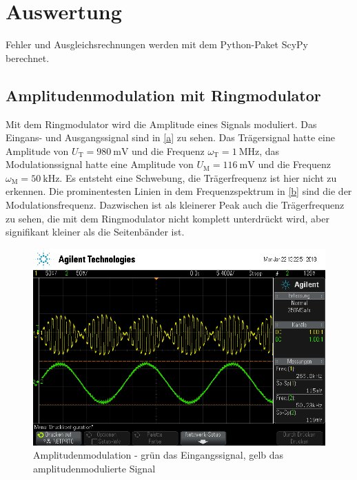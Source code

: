 \section{Auswertung}

Fehler und Ausgleichsrechnungen werden mit dem Python-Paket ScyPy \cite{scypy} berechnet.

\subsection{Amplitudenmodulation mit Ringmodulator}

Mit dem Ringmodulator wird die Amplitude eines Signals moduliert. Das Eingans- und Ausgangssignal sind in \autoref{a} zu sehen. Das Trägersignal hatte eine Amplitude von $U_\text{T}=\SI{980}{\milli\volt}$ und die Frequenz $\omega_\text{T}=\SI{1}{\mega\hertz}$, das Modulationssignal hatte eine Amplitude von $U_\text{M}=\SI{116}{\milli\volt}$ und die Frequenz $\omega_\text{M}=\SI{50}{\kilo\hertz}$. Es entsteht eine Schwebung, die Trägerfrequenz ist hier nicht zu erkennen. Die prominentesten Linien in dem Frequenzspektrum in \autoref{b} sind die der Modulationsfrequenz. Dazwischen ist als kleinerer Peak auch die Trägerfrequenz zu sehen, die mit dem Ringmodulator nicht komplett unterdrückt wird, aber signifikant kleiner als die Seitenbänder ist.

\begin{figure}
	\centering
	\includegraphics[width=\textwidth]{img/a_scope_230.png}
	\caption{Amplitudenmodulation - grün das Eingangssignal, gelb das amplitudenmodulierte Signal}
	\label{a}
\end{figure}

